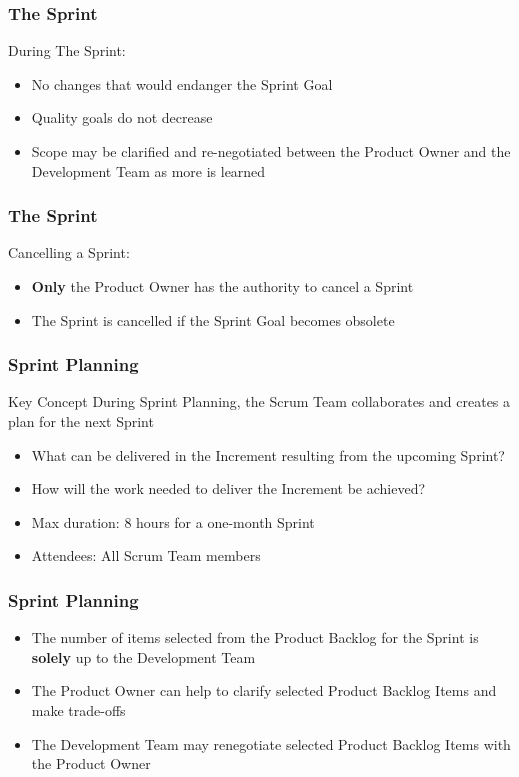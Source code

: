 \begin{frame}
	\frametitle{The Sprint}
	During The Sprint:
	\vspace{1em}
	\begin{itemize}
		\setlength\itemsep{0.7em}
		\item No changes that would endanger the Sprint Goal
		\item Quality goals do not decrease
		\item Scope may be clarified and re-negotiated between the Product Owner and the Development Team as more is learned
	\end{itemize}
\end{frame}

\begin{frame}
	\frametitle{The Sprint}
	Cancelling a Sprint:
	\begin{itemize}
		\setlength\itemsep{0.7em}
		\item \textbf{Only} the Product Owner has the authority to cancel a Sprint
		\item The Sprint is cancelled if the Sprint Goal becomes obsolete
	\end{itemize}
\end{frame}

\begin{frame}
	\frametitle{Sprint Planning}
	\begin{block}{Key Concept}
		During Sprint Planning, the Scrum Team collaborates and creates a plan for the next Sprint
	\end{block}
	\vspace{0.5em}
	\begin{itemize}
		\setlength\itemsep{0.7em}
		\item What can be delivered in the Increment resulting from the upcoming Sprint?
		\item How will the work needed to deliver the Increment be achieved?
		\item Max duration: 8 hours for a one-month Sprint
		\item Attendees: All Scrum Team members
	\end{itemize}
\end{frame}

\begin{frame}
	\frametitle{Sprint Planning}
	\begin{itemize}
		\setlength\itemsep{0.7em}
		\item The number of items selected from the Product Backlog for the Sprint is \textbf{solely} up to the Development Team
		\item The Product Owner can help to clarify selected Product Backlog Items and make trade-offs
		\item The Development Team may renegotiate selected Product Backlog Items with the Product Owner
	\end{itemize}
\end{frame}

